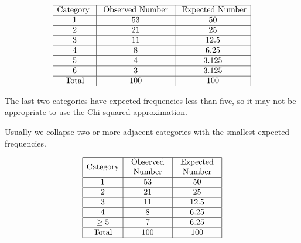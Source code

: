 \documentclass[oneside]{book}
\begin{document}
\[ \begin{array}{|c|c|c|}
        \hline \text{Category } & \text{ Observed Number } & \text{ Expected Number} \\
        \hline 1                & 53                       & 50                      \\
        \hline 2                & 21                       & 25                      \\
        \hline 3                & 11                       & 12.5                    \\
        \hline 4                & 8                        & 6.25                    \\
        \hline 5                & 4                        & 3.125                   \\
        \hline 6                & 3                        & 3.125                   \\
        \hline \text{Total}     & 100                      & 100                     \\
        \hline
    \end{array} \]

The last two categories have expected frequencies less than five, so it may not be
appropriate to use the Chi-squared approximation.

Usually we collapse two or more adjacent categories with the smallest expected frequencies.

\[ \begin{array}{|c|c|c|}
        \hline \text{Category} & \begin{array}{c}
                                     \text{Observed} \\
                                     \text{Number}
                                 \end{array} & \begin{array}{c}
                                                   \text{Expected} \\
                                                   \text{Number}
                                               \end{array} \\
        \hline 1               & 53                 & 50       \\
        \hline 2               & 21                 & 25       \\
        \hline 3               & 11                 & 12.5     \\
        \hline 4               & 8                  & 6.25     \\
        \hline \geq{5}         & 7                  & 6.25     \\
        \hline \text{Total}    & 100                & 100      \\
        \hline
    \end{array} \]
\end{document}
